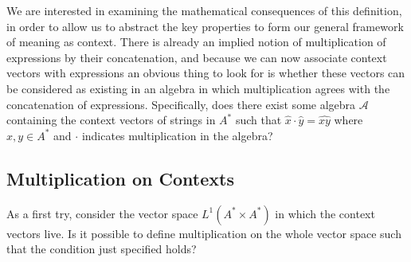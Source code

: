 \documentclass[11pt]{report}
\begin{document}



We are interested in examining the mathematical consequences of this definition, in order to allow us to abstract the key properties to form our general framework of meaning as context. There is already an implied notion of multiplication of expressions by their concatenation, and because we can now associate context vectors with expressions an obvious thing to look for is whether these vectors can be considered as existing in an algebra in which multiplication agrees with the concatenation of expressions. Specifically, does there exist some algebra $\mathcal{A}$ containing the context vectors of strings in $A^*$ such that $\hat{x}\cdot \hat{y} = \widehat{xy}$ where $x,y\in A^*$ and $\cdot$ indicates multiplication in the algebra?

\subsection{Multiplication on Contexts}

As a first try, consider the vector space $L^1(A^*\times A^*)$ in which the context vectors live. Is it possible to define multiplication on the whole vector space such that the condition just specified holds?
\end{document}
